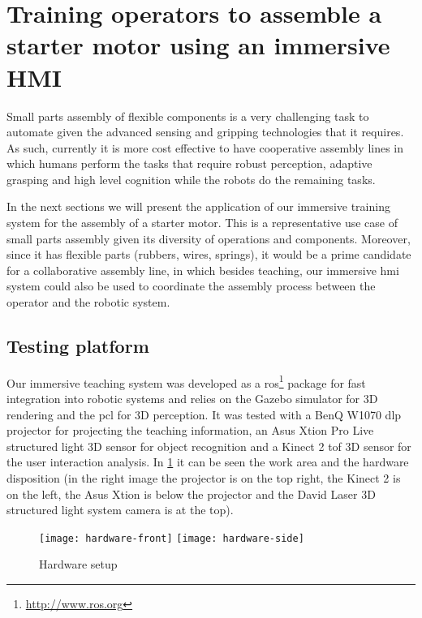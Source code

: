 \section{Training operators to assemble a starter motor using an immersive HMI}\label{sec:training}

Small parts assembly of flexible components is a very challenging task to automate given the advanced sensing and gripping technologies that it requires. As such, currently it is more cost effective to have cooperative assembly lines in which humans perform the tasks that require robust perception, adaptive grasping and high level cognition while the robots do the remaining tasks.

In the next sections we will present the application of our immersive training system for the assembly of a starter motor. This is a representative use case of small parts assembly given its diversity of operations and components. Moreover, since it has flexible parts (rubbers, wires, springs), it would be a prime candidate for a collaborative assembly line, in which besides teaching, our immersive \gls{hmi} system could also be used to coordinate the assembly process between the operator and the robotic system.



\subsection{Testing platform}

Our immersive teaching system was developed as a \gls{ros}\footnote{\url{http://www.ros.org}} package for fast integration into robotic systems and relies on the Gazebo simulator for 3D rendering and the \gls{pcl} for 3D perception. It was tested with a BenQ W1070 \gls{dlp} projector for projecting the teaching information, an Asus Xtion Pro Live structured light 3D sensor for object recognition and a Kinect 2 \gls{tof} 3D sensor for the user interaction analysis. In \cref{fig:hardware} it can be seen the work area and the hardware disposition (in the right image the projector is on the top right, the Kinect 2 is on the left, the Asus Xtion is below the projector and the David Laser 3D structured light system camera is at the top).

\begin{figure}[ht]
	\centering
	\texttt{[image: hardware-front]}
	\hspace{2em}
	\texttt{[image: hardware-side]}
	\caption{Hardware setup}
	\label{fig:hardware}
\end{figure}



